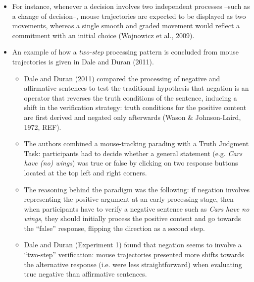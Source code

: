 \documentclass{article}
\begin{document}
\begin{itemize}
\item For instance, whenever a decision involves two independent processes --such as a change of decision--, mouse trajectories are expected to be displayed as two movements, whereas a single smooth and graded movement would reflect a commitment with an initial choice (Wojnowicz et al., 2009).


\item An example of how a \emph{two-step} processing pattern is concluded from mouse trajectories is given in Dale and Duran (2011).  

\begin{itemize}
\item Dale and Duran (2011) compared the processing of negative and affirmative sentences to test the traditional hypothesis that negation is an operator that reverses the truth conditions of the sentence, inducing a shift in the verification strategy: truth conditions for the positive content are first derived and negated only afterwards (Wason \& Johnson-Laird, 1972, REF). 

\item The authors combined a mouse-tracking parading with a Truth Judgment Task: participants had to decide whether a general statement (e.g. \textit{Cars have (no) wings}) was true or false by clicking on two response buttons located at the top left and right corners.

\item The reasoning behind the paradigm was the following: if negation involves representing the positive argument at an early processing stage, then when participants have to verify a negative sentence such as \textit{Cars have no wings}, they should initially process the positive content and go towards the ``false'' response, flipping the direction as a second step. 

\item Dale and Duran (Experiment 1) found that negation seems to involve a ``two-step'' verification: mouse trajectories presented more shifts towards the alternative response (i.e. were less straightforward) when evaluating true negative than affirmative sentences. 


\end{itemize}
\end{itemize}
\end{document}
